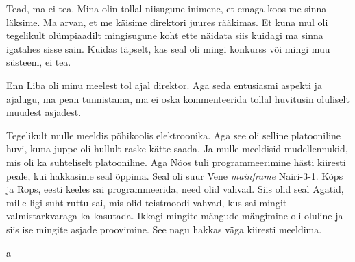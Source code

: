 
Tead, ma ei tea. Mina olin tollal niisugune inimene, et emaga koos me sinna 
läksime. Ma arvan, et me käisime direktori juures rääkimas. Et kuna mul oli 
tegelikult olümpiaadilt mingisugune koht ette näidata siis kuidagi ma sinna 
igatahes sisse sain. Kuidas täpselt, kas seal oli mingi konkurss või mingi muu 
süsteem, ei tea. 


Enn Liba oli minu meelest tol ajal direktor. Aga 
seda entusiasmi aspekti ja ajalugu, ma pean tunnistama,  ma ei oska 
kommenteerida tollal huvitusin  oluliselt muudest asjadest.


Tegelikult mulle meeldis põhikoolis elektroonika. Aga see oli selline 
platooniline huvi, kuna juppe oli hullult raske kätte saada. Ja mulle meeldisid 
mudellennukid, mis oli ka suhteliselt platooniline. Aga Nõos tuli 
programmeerimine hästi kiiresti peale, kui hakkasime seal õppima. Seal oli suur 
Vene \emph{mainframe} Nairi-3-1. 
Kõps ja Rops, eesti keeles sai 
programmeerida, need olid  vahvad. Siis olid seal Agatid, 
mille ligi suht ruttu sai, mis olid teistmoodi vahvad, kus sai mingit 
valmistarkvaraga ka kasutada. Ikkagi mingite mängude mängimine oli oluline ja  
siis ise mingite asjade proovimine. See nagu hakkas väga kiiresti meeldima.

a 

